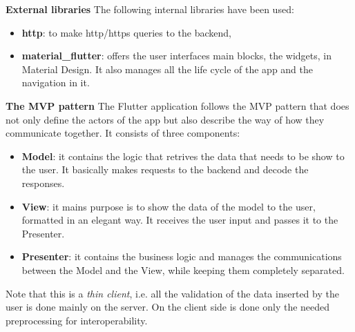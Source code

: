 \textbf{External libraries} The following internal libraries have been used:
\begin{itemize}
    \item \textbf{http}: to make http/https queries to the backend,
    \item \textbf{material\_flutter}: offers the user interfaces main blocks, the widgets, in Material Design. It also manages all the life cycle of the app and the navigation in it.
\end{itemize}

\textbf{The MVP pattern} The Flutter application follows the MVP pattern that does not only define the actors of the app but also describe the way of how they communicate together. It consists of three components:
\begin{itemize}
    \item \textbf{Model}: it contains the logic that retrives the data that needs to be show to the user. It basically makes requests to the backend and decode the responses.
    \item \textbf{View}: it mains purpose is to show the data of the model to the user, formatted in an elegant way. It receives the user input and passes it to the Presenter.
    \item \textbf{Presenter}: it contains the business logic and manages the communications between the Model and the View, while keeping them completely separated.
\end{itemize}

Note that this is a \textit{thin client}, i.e. all the validation of the data inserted by the user is done mainly on the server. On the client side is done only the needed preprocessing for interoperability. 